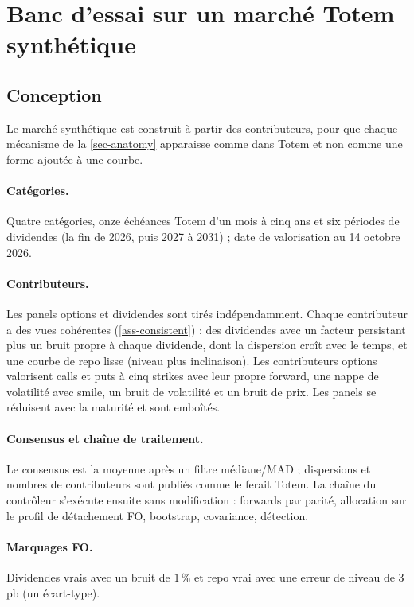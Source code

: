 \section{Banc d'essai sur un marché Totem synthétique}\label{sec-benchmark}

\subsection{Conception}
Le marché synthétique est construit à partir des contributeurs, pour que chaque mécanisme de la \cref{sec-anatomy}
apparaisse comme dans Totem et non comme une forme ajoutée à une courbe.

\paragraph{Catégories.} Quatre catégories, onze échéances Totem d'un mois à cinq ans et six périodes de dividendes (la
fin de 2026, puis 2027 à 2031) ; date de valorisation au 14 octobre 2026.
\begin{center}\end{center}

\paragraph{Contributeurs.} Les panels options et dividendes sont tirés indépendamment. Chaque contributeur a des vues
cohérentes (\cref{ass-consistent}) : des dividendes avec un facteur persistant plus un bruit propre à chaque dividende,
dont la dispersion croît avec le temps, et une courbe de repo lisse (niveau plus inclinaison). Les contributeurs options
valorisent calls et puts à cinq strikes avec leur propre forward, une nappe de volatilité avec smile, un bruit de
volatilité et un bruit de prix. Les panels se réduisent avec la maturité et sont emboîtés.

\paragraph{Consensus et chaîne de traitement.} Le consensus est la moyenne après un filtre médiane/MAD ; dispersions et
nombres de contributeurs sont publiés comme le ferait Totem. La chaîne du contrôleur s'exécute ensuite sans
modification : forwards par parité, allocation sur le profil de détachement FO, bootstrap, covariance, détection.

\paragraph{Marquages FO.} Dividendes vrais avec un bruit de $1\,\%$ et repo vrai avec une erreur de niveau de $3$\,pb (un
écart-type).

